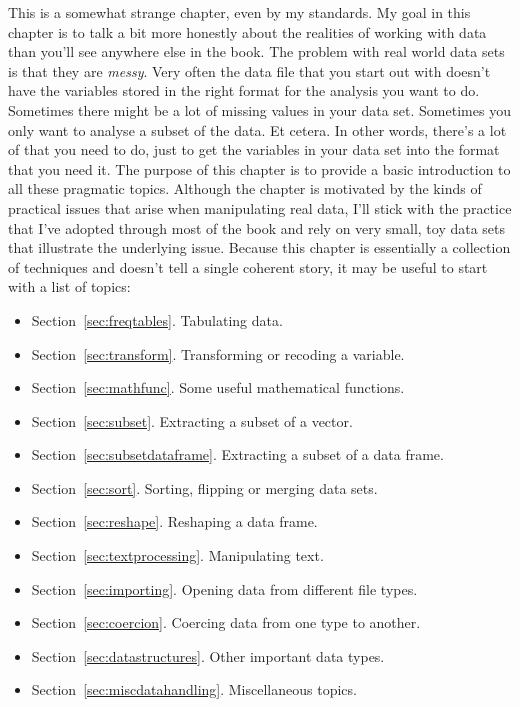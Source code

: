 \noindent
This is a somewhat strange chapter, even by my standards. My goal in this chapter is to talk a bit more honestly about the realities of working with data than you'll see anywhere else in the book. The problem with real world data sets is that they are {\it messy}. Very often the data file that you start out with doesn't have the variables stored in the right format for the analysis you want to do. Sometimes there might be a lot of missing values in your data set. Sometimes you only want to analyse a subset of the data. Et cetera. In other words, there's a lot of  that you need to do, just to get the variables in your data set into the format that you need it. The purpose of this chapter is to provide a basic introduction to all these pragmatic topics. Although the chapter is motivated by the kinds of practical issues that arise when manipulating real data, I'll stick with the practice that I've adopted through most of the book and rely on very small, toy data sets that illustrate the underlying issue. Because this chapter is essentially a collection of techniques and doesn't tell a single coherent story, it may be useful to start with a list of topics:
\begin{itemize} \itemsep 0pt
\item Section~\ref{sec:freqtables}. Tabulating data.
\item Section~\ref{sec:transform}. Transforming or recoding a variable.
\item Section~\ref{sec:mathfunc}. Some useful mathematical functions.
\item Section~\ref{sec:subset}. Extracting a subset of a vector.
\item Section~\ref{sec:subsetdataframe}. Extracting a subset of a data frame.
\item Section~\ref{sec:sort}. Sorting, flipping or merging data sets.
\item Section~\ref{sec:reshape}. Reshaping a data frame.
\item Section~\ref{sec:textprocessing}. Manipulating text.
\item Section~\ref{sec:importing}. Opening data from different file types.
\item Section~\ref{sec:coercion}. Coercing data from one type to another.
\item Section~\ref{sec:datastructures}. Other important data types.
\item Section~\ref{sec:miscdatahandling}. Miscellaneous topics.
\end{itemize}
